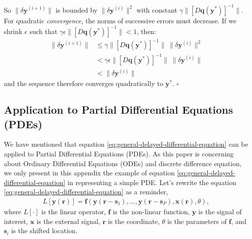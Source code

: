 So $\big\| \delta \mathbf{y}^{(i+1)} \big\|$ is bounded by $\big\| \delta \mathbf{y}^{(i)} \big\|^2$ with constant $\gamma \big \|[D\mathbf{q}(\mathbf{y}^*)]^{-1}\big \|$. For quadratic \textit{convergence}, the norms of successive errors must decrease. If we shrink $\epsilon$ such that $\gamma \epsilon \big \|[D\mathbf{q}(\mathbf{y}^*)]^{-1}\big \| < 1$, then:
\begin{equation}
\begin{split}
    \big\| \delta \mathbf{y}^{(i+1)} \big\|
    & \le \gamma \big \|[D\mathbf{q}(\mathbf{y}^*)]^{-1}\big \|  \ \big \|\delta \mathbf{y}^{(i)}\big \|^2  \\
    & < \gamma \epsilon \big \|[D\mathbf{q}(\mathbf{y}^*)]^{-1}\big \|  \ \big \|\delta \mathbf{y}^{(i)}\big \| \\
    & < \big \|\delta \mathbf{y}^{(i)}\big \|
\end{split}
\end{equation}
and the sequence therefore converges quadratically to $\mathbf{y}^*$. \hfill $\square$



\subsection{Application to Partial Differential Equations (PDEs)}
\label{appsubsec:pde-example}

We have mentioned that equation \ref{eq:general-delayed-differential-equation} can be applied to Partial Differential Equations (PDEs).
As this paper is concerning about Ordinary Differential Equations (ODEs) and discrete difference equation, we only present in this appendix the example of equation \ref{eq:general-delayed-differential-equation} in representing a simple PDE.
Let's rewrite the equation \ref{eq:general-delayed-differential-equation} as a reminder,
\begin{align}
    L[\mathbf{y}(\mathbf{r})] = \mathbf{f}\left(\mathbf{y}(\mathbf{r} - \mathbf{s}_1), ..., \mathbf{y}(\mathbf{r} - \mathbf{s}_P), \mathbf{x}(\mathbf{r}), \theta\right),
\end{align}
where $L[\cdot]$ is the linear operator, $\mathbf{f}$ is the non-linear function, $\mathbf{y}$ is the signal of interest, $\mathbf{x}$ is the external signal, $\mathbf{r}$ is the coordinate, $\theta$ is the parameters of $\mathbf{f}$, and $\mathbf{s}_i$ is the shifted location.


